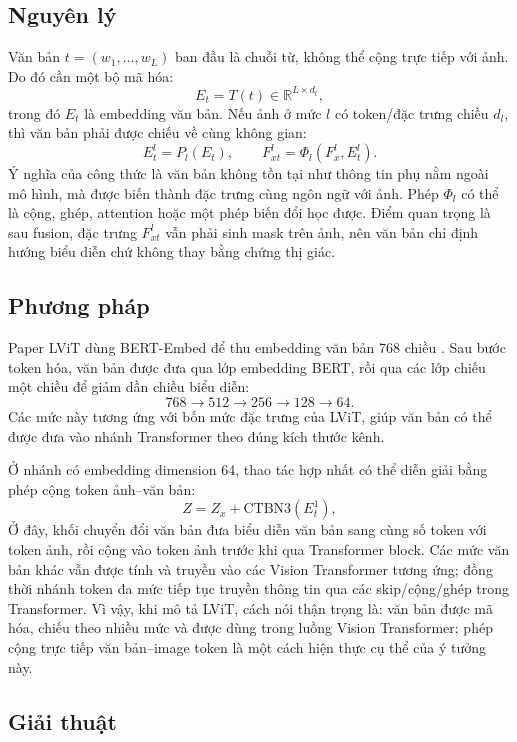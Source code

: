 \subsection*{Nguyên lý}

Văn bản \(t=(w_1,\ldots,w_L)\) ban đầu là chuỗi từ, không thể cộng trực tiếp với ảnh. Do đó cần một bộ mã hóa:
\[
E_t = T(t)\in\mathbb{R}^{L\times d_t},
\]
trong đó \(E_t\) là embedding văn bản. Nếu ảnh ở mức \(l\) có token/đặc trưng chiều \(d_l\), thì văn bản phải được chiếu về cùng không gian:
\[
E_t^l = P_l(E_t), \qquad F_{xt}^l=\Phi_l(F_x^l,E_t^l).
\]
Ý nghĩa của công thức là văn bản không tồn tại như thông tin phụ nằm ngoài mô hình, mà được biến thành đặc trưng cùng ngôn ngữ với ảnh. Phép \(\Phi_l\) có thể là cộng, ghép, attention hoặc một phép biến đổi học được. Điểm quan trọng là sau fusion, đặc trưng \(F_{xt}^l\) vẫn phải sinh mask trên ảnh, nên văn bản chỉ định hướng biểu diễn chứ không thay bằng chứng thị giác.

\subsection*{Phương pháp}

Paper LViT dùng BERT-Embed để thu embedding văn bản 768 chiều \cite{li2023lvit}. Sau bước token hóa, văn bản được đưa qua lớp embedding BERT, rồi qua các lớp chiếu một chiều để giảm dần chiều biểu diễn:
\[
768 \rightarrow 512 \rightarrow 256 \rightarrow 128 \rightarrow 64.
\]
Các mức này tương ứng với bốn mức đặc trưng của LViT, giúp văn bản có thể được đưa vào nhánh Transformer theo đúng kích thước kênh.

Ở nhánh có embedding dimension 64, thao tác hợp nhất có thể diễn giải bằng phép cộng token ảnh--văn bản:
\[
Z = Z_x + \mathrm{CTBN3}(E_t^1),
\]
Ở đây, khối chuyển đổi văn bản đưa biểu diễn văn bản sang cùng số token với token ảnh, rồi cộng vào token ảnh trước khi qua Transformer block. Các mức văn bản khác vẫn được tính và truyền vào các Vision Transformer tương ứng; đồng thời nhánh token đa mức tiếp tục truyền thông tin qua các skip/cộng/ghép trong Transformer. Vì vậy, khi mô tả LViT, cách nói thận trọng là: văn bản được mã hóa, chiếu theo nhiều mức và được dùng trong luồng Vision Transformer; phép cộng trực tiếp văn bản--image token là một cách hiện thực cụ thể của ý tưởng này.

\subsection*{Giải thuật}


